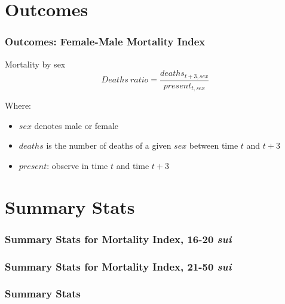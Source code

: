 \section{Outcomes}
\begin{frame}[label=mortratio]
\frametitle{Outcomes: Female-Male Mortality Index \hyperlink{data}{} }
\begin{block}{Mortality by sex}
\begin{equation}
Deaths \ ratio = \frac{deaths_{t+3,sex}}{present_{t,sex}}
\end{equation}
\end{block}

Where:\\
\begin{itemize}
\item $sex$ denotes male or female\\
\item $deaths$ is the number of deaths of a given $sex$ between time $t$ and $t+3$\\
\item $present$: observe in time $t$ and time $t+3$
\end{itemize}

\end{frame}



\section{Summary Stats}





\begin{frame}[label = sumstats16to20]
\frametitle{Summary Stats for Mortality Index, 16-20 \emph{sui} \hyperlink{datadefs}{} \hyperlink{results16to20}{}}
{\tiny }
\end{frame}

\begin{frame}[label = sumstats21to50]
\frametitle{Summary Stats for Mortality Index, 21-50 \emph{sui} \hyperlink{datadefs}{} \hyperlink{results21to50}{}}
{\tiny }
\end{frame}

\begin{frame}[label = sumstats]
\frametitle{Summary Stats \hyperlink{datadefs}{} \hyperlink{results}{}}
{\tiny }
\end{frame}

